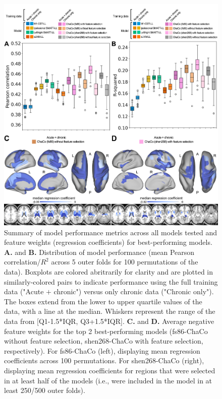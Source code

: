 \documentclass[10pt]{article}
\def\Plus{\texttt{+}}
\begin{document}
\begin{figure}[htp]
\centering
\includegraphics[width=1\linewidth]{figures/Analysis1.png}
\caption{Summary of model performance metrics across all models tested and feature weights (regression coefficients) for best-performing models.  \textbf{A.} and \textbf{B.} Distribution of model performance (mean Pearson correlation/$R^2$ across 5 outer folds for 100 permutations of the data).  Boxplots are colored abritrarily for clarity and are plotted in similarly-colored pairs to indicate performance using the full training data ("Acute $\Plus$  chronic") versus only chronic data ("Chronic only"). The boxes extend from the lower to upper quartile values of the data, with a line at the median. Whiskers represent the range of the data from [Q1-1.5*IQR, Q3+1.5*IQR].
\textbf{C.} and \textbf{D.} Average negative feature weights for the top 2 best-performing models (fs86-ChaCo without feature selection, shen268-ChaCo with feature selection, respectively). For fs86-ChaCo (left), displaying mean regression coefficients across 100 permutations. For shen268-ChaCo (right), displaying mean regression coefficients for regions that were selected in at least half of the models (i.e., were included in the model in at least 250/500 outer folds). }
\label{analysis1}
\end{figure}
\end{document}
